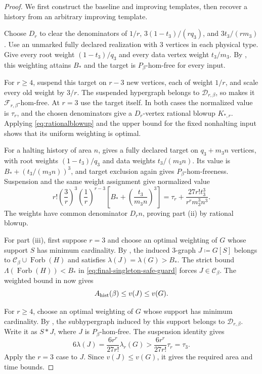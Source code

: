 \documentclass[10pt]{article}
\numberwithin{equation}{section}
\theoremstyle{definition}
\newcommand{\Forb}{\operatorname{Forb}}\newcommand{\Ext}{\operatorname{Ext}}
\begin{document}
\begin{proof}
We first construct the baseline and improving templates, then recover a history from an arbitrary improving template.

Choose $D_r$ to clear the denominators of $1/r$, $3(1-t_3)/(rq_3)$, and $3t_3/(rm_3)$. Use an unmarked fully declared realization with 3 vertices in each physical type. Give every root weight $(1-t_3)/q_3$ and every data vertex weight $t_3/m_3$. By , this weighting attains $B_*$ and the target is $P_\beta$-hom-free for every input.

For $r\ge4$, suspend this target on $r-3$ new vertices, each of weight $1/r$, and scale every old weight by $3/r$. The suspended hypergraph belongs to $\mathcal D_{r,\beta}$, so  makes it $\mathcal F_{r,\beta}$-hom-free. At $r=3$ use the target itself. In both cases the normalized value is $\tau_r$, and the chosen denominators give a $D_r$-vertex rational blowup $K_{*,r}$. Applying \eqref{eq:rationalblowup} and the upper bound for the fixed nonhalting input shows that its uniform weighting is optimal.

For a halting history of area $n$,  gives a fully declared target on $q_3+m_3n$ vertices, with root weights $(1-t_3)/q_3$ and data weights $t_3/(m_3n)$. Its value is $B_*+(t_3/(m_3n))^3$, and target exclusion again gives $P_\beta$-hom-freeness. Suspension and the same weight assignment give normalized value
\[
 r!\left(\frac3r\right)^3\left(\frac1r\right)^{r-3}
 \left[B_*+\left(\frac{t_3}{m_3n}\right)^3\right]
 =\tau_r+\frac{27r!t_3^3}{r^rm_3^3n^3}.
\]
The weights have common denominator $D_rn$, proving part \textup{(ii)} by rational blowup.

For part \textup{(iii)}, first suppose $r=3$ and choose an optimal weighting of $G$ whose support $S$ has minimum cardinality. By , the induced $3$-graph $J\coloneqq G[S]$ belongs to $\mathcal C_\beta\cup\Forb(H)$ and satisfies $\lambda(J)=\lambda(G)>B_*$. The strict bound $\Lambda(\Forb(H))<B_*$ in \eqref{eq:final-singleton-safe-guard} forces $J\in\mathcal C_\beta$. The weighted bound in  now gives
\[
 A_{\rm hist}(\beta)\le v(J)\le v(G).
\]

For $r\ge4$, choose an optimal weighting of $G$ whose support has minimum cardinality. By , the subhypergraph induced by this support belongs to $\mathcal D_{r,\beta}$. Write it as $S*J$, where $J$ is $P_\beta$-hom-free. The suspension identity gives
\[
 6\lambda(J)=\frac{6r^r}{27r!}\lambda_r(G)
 >\frac{6r^r}{27r!}\tau_r=\tau_3.
\]
Apply the $r=3$ case to $J$. Since $v(J)\le v(G)$, it gives the required area and time bounds.


\end{proof}
\end{document}
